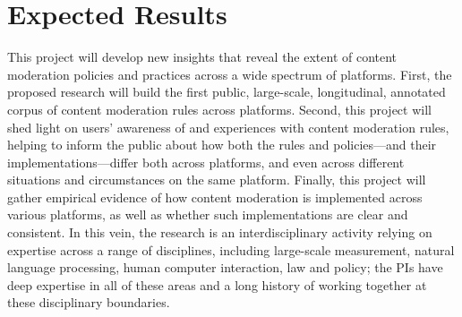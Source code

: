 \section{Expected Results}
\label{sec:results}


This project will develop new insights that reveal the extent of content
moderation policies and practices across a wide spectrum of platforms. 
First, the proposed research will build the first
public, large-scale, longitudinal, annotated corpus of content moderation
rules across platforms.
Second, this project will shed light on
users' awareness of and experiences with content moderation rules, helping to
inform the public about how both the rules and policies---and their
implementations---differ both across platforms, and even across different
situations and circumstances on the same platform.
Finally, this project will gather empirical evidence of 
how content moderation is implemented across various platforms, as well as
whether such implementations are clear and consistent. In this vein, the
research is an interdisciplinary activity relying on expertise across a range
of disciplines, including large-scale measurement, natural language
processing, human computer interaction, law and policy; the PIs have deep
 expertise in all of these areas and a long history of working together at
 these disciplinary boundaries.

